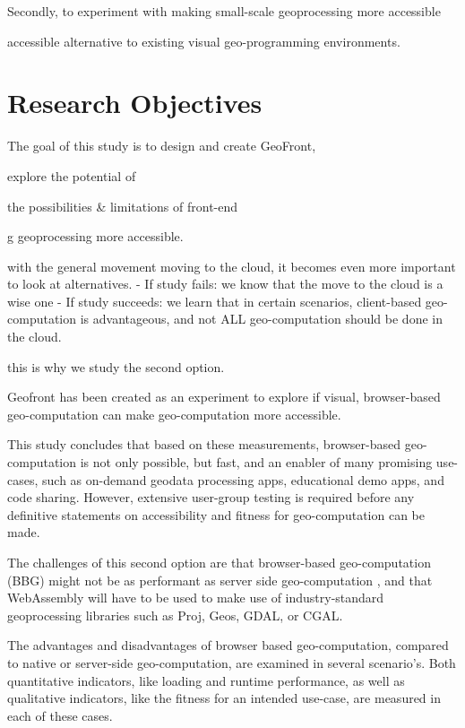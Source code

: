 Secondly, to experiment with making small-scale geoprocessing more accessible


accessible alternative to existing visual geo-programming environments.

\section{Research Objectives}


The goal of this study is to design and create GeoFront, 

explore the potential of 

the possibilities \& limitations of front-end 





g geoprocessing more accessible.


with the general movement moving to the cloud, it becomes even more important to look at alternatives. 
- If study fails: we know that the move to the cloud is a wise one
- If study succeeds: we learn that in certain scenarios, client-based geo-computation is advantageous, and not ALL geo-computation should be done in the cloud.

this is why we study the second option. 


Geofront has been created as an experiment to explore if visual, browser-based geo-computation can make geo-computation more accessible. 


This study concludes that based on these measurements, browser-based geo-computation is not only possible, but fast, and an enabler of many promising use-cases, such as on-demand geodata processing apps, educational demo apps, and code sharing. However, extensive user-group testing is required before any definitive statements on accessibility and fitness for geo-computation can be made.  





The challenges of this second option are that browser-based geo-computation (BBG) might not be as performant as server side geo-computation \cite{panidi_hybrid_2015, hamilton_client-side_2014}, and that WebAssembly will have to be used to make use of industry-standard geoprocessing libraries such as Proj, Geos, GDAL, or CGAL.


The advantages and disadvantages of browser based geo-computation, compared to native or server-side geo-computation, are examined in several scenario's. 
Both quantitative indicators, like loading and runtime performance, as well as qualitative indicators, like the fitness for an intended use-case, are measured in each of these cases.

